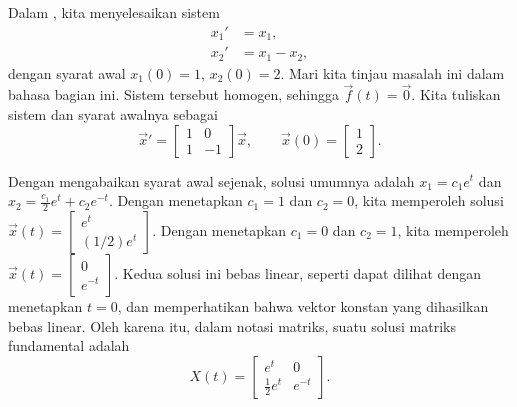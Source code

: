 \begin{example}
Dalam , kita menyelesaikan sistem
\begin{align*}
x_1' & = x_1 , \\
x_2' & = x_1 - x_2 ,
\end{align*}
dengan syarat awal $x_1(0) = 1$, $x_2(0) = 2$.
Mari kita tinjau masalah ini dalam bahasa bagian ini.
Sistem tersebut homogen, sehingga $\vec{f}(t) = \vec{0}$.
Kita tuliskan sistem dan syarat awalnya sebagai
\begin{equation*}
{\vec{x}}'
=
\begin{bmatrix}
1 & 0 \\
1 & -1
\end{bmatrix}
\vec{x} ,
\qquad
\vec{x}(0) =
\begin{bmatrix}
1 \\
2
\end{bmatrix} .
\end{equation*}

Dengan mengabaikan syarat awal sejenak,
solusi umumnya adalah
$x_1 = c_1 e^t $ dan
$x_2 = \frac{c_1}{2}e^{t} + c_2e^{-t}$.
Dengan menetapkan $c_1=1$ dan $c_2=0$, kita memperoleh solusi
$\vec{x}(t) = \left[ \begin{smallmatrix} e^t \\ (1/2) e^t \end{smallmatrix} \right]$.
Dengan menetapkan $c_1=0$ dan $c_2=1$, kita memperoleh
$\vec{x}(t) = \left[ \begin{smallmatrix} 0 \\ e^{-t} \end{smallmatrix} \right]$.
Kedua solusi ini bebas linear,
seperti dapat dilihat dengan menetapkan
$t=0$, dan memperhatikan bahwa vektor konstan yang dihasilkan
bebas linear.
Oleh karena itu, dalam notasi matriks, suatu solusi matriks fundamental adalah
\begin{equation*}
X(t) =
\begin{bmatrix}
e^t & 0 \\
\frac{1}{2} e^t & e^{-t}
\end{bmatrix} .
\end{equation*}


\end{example}
